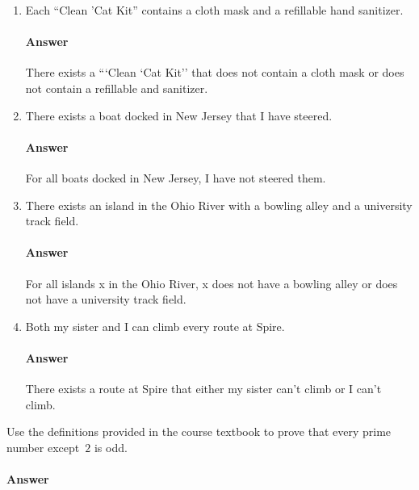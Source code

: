 \documentclass{article}
\begin{document}
\begin{enumerate}

    \item Each ``Clean 'Cat Kit''  contains a cloth mask and a refillable hand
        sanitizer.

        \paragraph{Answer}
        There exists a ```Clean `Cat Kit'' that does not contain a cloth mask or does not contain a refillable and sanitizer.

    \item There exists a boat docked in New Jersey that I have steered.

        \paragraph{Answer}
        For all boats docked in New Jersey, I have not steered them.

    \item There exists an island in the Ohio River with a bowling alley and a
        university track field.

        \paragraph{Answer}
        For all islands x in the Ohio River, x does not have a bowling alley or does not have a university track field.

    \item Both my sister and I can climb every route at Spire.

        \paragraph{Answer}
	There exists a route at Spire that either my sister can't climb or I can't climb.

\end{enumerate}

 
Use the definitions provided in the course textbook to prove that every prime
number except~$2$ is odd.

\paragraph{Answer}
\end{document}
